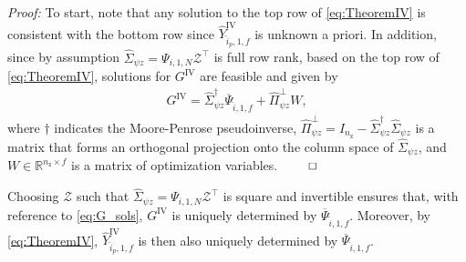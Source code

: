 \noindent\textit{Proof:} To start, note that any solution to the top row of \eqref{eq:TheoremIV} is consistent with the bottom row since $\widehat{Y}_{\hat{i}_p,1,f}^\mathrm{IV}$ is unknown a priori. In addition, since by assumption $\hat{\Sigma}_{\psi z}=\Psi_{i,1,N}\mathcal{Z}^\top$ is full row rank, based on the top row of \eqref{eq:TheoremIV}, solutions for $G^\mathrm{IV}$ are feasible and given by
\begin{align}\label{eq:G_sols}
    G^\mathrm{IV} = \hat{\Sigma}_{\psi z}^\dagger\overline{\Psi}_{\hat{i},1,f}+\hat{\Pi}_{\psi z}^\bot W,
\end{align}
where $\dagger$ indicates the Moore-Penrose pseudoinverse, ${\hat{\Pi}_{\psi z}^\bot=I_{n_\mathrm{z}}-\hat{\Sigma}_{\psi z}^\dagger\hat{\Sigma}_{\psi z}}$ is a matrix that forms an orthogonal projection onto the column space of $\hat{\Sigma}_{\psi z}$, and $W\in\mathbb{R}^{n_\mathrm{z}\times f}$ is a matrix of optimization variables. $\hfill\qed$

\setcounter{thm}{0}
\begin{rem}\label{rem:square_min_opt_var}
    Choosing $\mathcal{Z}$ such that $\hat{\Sigma}_{\psi z}=\Psi_{i,1,N}\mathcal{Z}^\top$ is square and invertible ensures that, with reference to \eqref{eq:G_sols}, $G^\mathrm{IV}$ is uniquely determined by $\overline{\Psi}_{\hat{i},1,f}$. Moreover, by \eqref{eq:TheoremIV}, $\widehat{Y}_{\hat{i}_p,1,f}^\mathrm{IV}$ is then also uniquely determined by $\overline{\Psi}_{\hat{i},1,f}$.
\end{rem}

